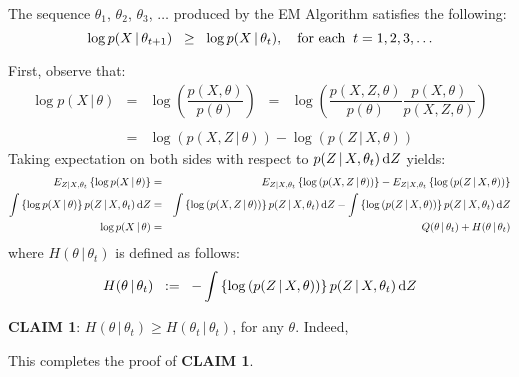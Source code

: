 \begin{theorem}\quad
The sequence $\theta_{1}$, $\theta_{2}$, $\theta_{3}$, $\ldots$ produced by the EM Algorithm
satisfies the following:
\begin{equation*}
\log p(X\,|\,\theta_{t+1}) \;\; \geq \;\; \log p(X\,|\,\theta_{t}),
\quad
\textnormal{for each}\;\;t = 1, 2, 3, \ldots
\end{equation*}
\end{theorem}
\proof First, observe that:
\begin{eqnarray*}
\log p(X\,|\,\theta)
& = & \log\left(\dfrac{p(X,\theta)}{p(\theta)}\right)
\;\; = \;\; \log\left(\dfrac{p(X,Z,\theta)}{p(\theta)}\dfrac{p(X,\theta)}{p(X,Z,\theta)}\right) \\
&& \\
& = & \log\left(p(X,Z\,|\,\theta)\right) - \log\left(p(Z\,|\,X,\theta)\right)
\end{eqnarray*}
Taking expectation on both sides with respect to $p(Z\,|\,X,\theta_{t})\,\textnormal{d}Z$ yields:
\begin{eqnarray*}
E_{Z|X,\theta_{t}}\left\{\log p(X\,|\,\theta)\right\}
& = &
E_{Z|X,\theta_{t}}\left\{\log\left(p(X,Z\,|\,\theta)\right)\right\}
-
E_{Z|X,\theta_{t}}\left\{\log\left(p(Z\,|\,X,\theta)\right)\right\}
\\
\int\left\{\log p(X\,|\,\theta)\right\}p(Z\,|\,X,\theta_{t})\,\textnormal{d}Z
& = &
\int\left\{\log\left(p(X,Z\,|\,\theta)\right)\right\}p(Z\,|\,X,\theta_{t})\,\textnormal{d}Z
-
\int\left\{\log\left(p(Z\,|\,X,\theta)\right)\right\}p(Z\,|\,X,\theta_{t})\,\textnormal{d}Z
\\
\log p(X\,|\,\theta)
& = &
Q(\theta\,|\,\theta_{t}) + H(\theta\,|\,\theta_{t})
\end{eqnarray*}
where $H(\theta\,|\,\theta_{t})$ is defined as follows:
\begin{equation*}
H(\theta\,|\,\theta_{t})
\;\; := \;\;
- \int\left\{\log\left(p(Z\,|\,X,\theta)\right)\right\}p(Z\,|\,X,\theta_{t})\,\textnormal{d}Z
\end{equation*}

\vskip 0.5cm
\noindent
\textbf{CLAIM 1}:\;\; $H(\theta\,|\,\theta_{t}) \geq H(\theta_{t}\,|\,\theta_{t})$,\;\; for any $\theta$.
\vskip 0.1cm
\noindent
Indeed, 

This completes the proof of \textbf{CLAIM 1}.

